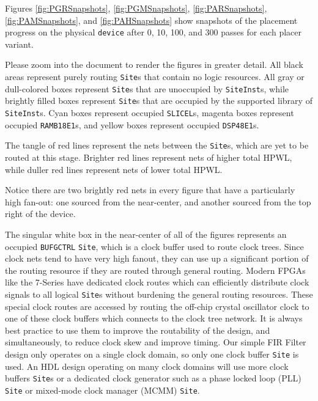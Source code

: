 \begin{multicols}{2}

    Figures \ref{fig:PGRSnapshots}, \ref{fig:PGMSnapshots}, \ref{fig:PARSnapshots}, \ref{fig:PAMSnapshots}, and \ref{fig:PAHSnapshots} show snapshots of the placement progress on the physical \texttt{device} after 0, 10, 100, and 300 passes for each placer variant.

    Please zoom into the document to render the figures in greater detail.
    All black areas represent purely routing \texttt{Site}s that contain no logic resources. 
    All gray or dull-colored boxes represent \texttt{Site}s that are unoccupied by \texttt{SiteInst}s, while brightly filled boxes represent \texttt{Site}s that are occupied by the supported library of \texttt{SiteInst}s.
    Cyan boxes represent occupied \texttt{SLICEL}s, magenta boxes represent occupied \texttt{RAMB18E1}s, and yellow boxes represent occupied \texttt{DSP48E1}s.

    The tangle of red lines represent the nets between the \texttt{Site}s, which are yet to be routed at this stage. 
    Brighter red lines represent nets of higher total HPWL, while duller red lines represent nets of lower total HPWL.

    Notice there are two brightly red nets in every figure that have a particularly high fan-out:
    one sourced from the near-center, and another sourced from the top right of the device. 

    The singular white box in the near-center of all of the figures represents an occupied \texttt{BUFGCTRL} \texttt{Site}, which is a clock buffer used to route clock trees. 
    Since clock nets tend to have very high fanout, they can use up a significant portion of the routing resource if they are routed through general routing.
    Modern FPGAs like the 7-Series have dedicated clock routes which can efficiently distribute clock signals to all logical \texttt{Site}s without burdening the general routing resources.
    These special clock routes are accessed by routing the off-chip crystal oscillator clock to one of these clock buffers which connects to the clock tree network.
    It is always best practice to use them to improve the routability of the design, and simultaneously, to reduce clock skew and improve timing. 
    Our simple FIR Filter design only operates on a single clock domain, so only one clock buffer \texttt{Site} is used. 
    An HDL design operating on many clock domains will use more clock buffers \texttt{Site}s or a dedicated clock generator such as a phase locked loop (PLL) \texttt{Site} or mixed-mode clock manager (MCMM) \texttt{Site}.


\end{multicols}
